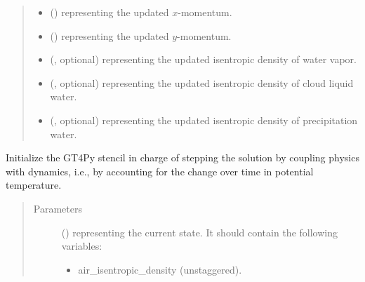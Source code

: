 \documentclass[letterpaper,10pt,english]{sphinxmanual}
\begin{document}
\begin{fulllineitems}
\begin{fulllineitems}
\begin{quote}
\begin{description}
\begin{itemize}
\item {} 
 () \textendash{}  representing the updated \(x\)-momentum.

\item {} 
 () \textendash{}  representing the updated \(y\)-momentum.

\item {} 
 (, optional) \textendash{}  representing the updated isentropic density of water vapor.

\item {} 
 (, optional) \textendash{}  representing the updated isentropic density of cloud liquid water.

\item {} 
 (, optional) \textendash{}  representing the updated isentropic density of precipitation water.

\end{itemize}


\end{description}\end{quote}

\end{fulllineitems}


\begin{fulllineitems}
\label{\detokenize{api:dycore.prognostic_isentropic.PrognosticIsentropic._stencil_stepping_by_coupling_physics_with_dynamics_initialize}}
Initialize the GT4Py stencil in charge of stepping the solution by coupling physics with dynamics,
i.e., by accounting for the change over time in potential temperature.
\begin{quote}\begin{description}
\item[{Parameters}] \leavevmode
{} () \textendash{} 
 representing the current state.
It should contain the following variables:
\begin{itemize}
\item {} 
air\_isentropic\_density (unstaggered).


\end{itemize}
\end{description}
\end{quote}
\end{fulllineitems}
\end{fulllineitems}
\end{document}
